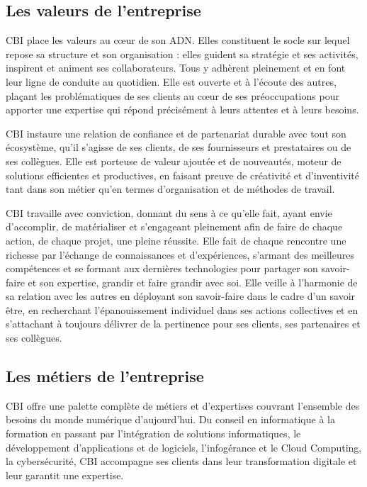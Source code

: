 \documentclass[12pt, a4paper]{report}
\begin{document}
\subsection{Les valeurs de l’entreprise}
CBI place les valeurs au cœur de son ADN. Elles constituent le socle sur lequel repose sa structure et son organisation : elles guident sa stratégie et ses activités, inspirent et animent ses collaborateurs. Tous y adhèrent pleinement et en font leur ligne de conduite au quotidien. Elle est ouverte et à l’écoute des autres, plaçant les problématiques de ses clients au cœur de ses préoccupations pour apporter une expertise qui répond précisément à leurs attentes et à leurs besoins. 

CBI instaure une relation de confiance et de partenariat durable avec tout son écosystème, qu’il s’agisse de ses clients, de ses fournisseurs et prestataires ou de ses collègues. Elle est porteuse de valeur ajoutée et de nouveautés, moteur de solutions efficientes et productives, en faisant preuve de créativité et d’inventivité tant dans son métier qu’en termes d’organisation et de méthodes de travail. 

CBI travaille avec conviction, donnant du sens à ce qu’elle fait, ayant envie d’accomplir, de matérialiser et s’engageant pleinement afin de faire de chaque action, de chaque projet, une pleine réussite. Elle fait de chaque rencontre une richesse par l’échange de connaissances et d’expériences, s’armant des meilleures compétences et se formant aux dernières technologies pour partager son savoir-faire et son expertise, grandir et faire grandir avec soi. Elle veille à l’harmonie de sa relation avec les autres en déployant son savoir-faire dans le cadre d’un savoir être, en recherchant l’épanouissement individuel dans ses actions collectives et en s’attachant à toujours délivrer de la pertinence pour ses clients, ses partenaires et ses collègues.

\subsection{Les métiers de l’entreprise}
CBI offre une palette complète de métiers et d’expertises couvrant l’ensemble des besoins du monde numérique d’aujourd’hui. Du conseil en informatique à la formation en passant par l’intégration de solutions informatiques, le développement d’applications et de logiciels, l’infogérance et le Cloud Computing, la cybersécurité, CBI accompagne ses clients dans leur transformation digitale et leur garantit une expertise.
\end{document}
